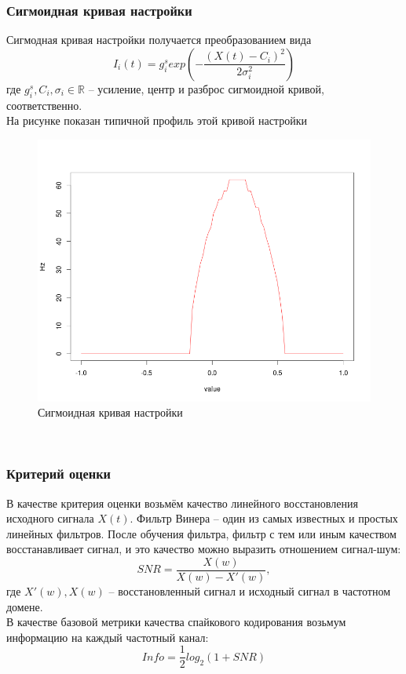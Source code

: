 \documentclass[a4paper,10pt,usenames]{article}
\begin{document}
\subsubsection{Сигмоидная кривая настройки}
\indent Сигмодная кривая настройки получается преобразованием вида
\begin{equation}
I_{i}(t) = g^{s}_{i}exp\left(-\frac{(X(t)-C_{i})^2}{2\sigma_{i}^2} \right)
\end{equation}
где $g^{s}_{i}, C_{i}, \sigma_{i} \in \mathbb{R}$ -- усиление, центр и разброс сигмоидной кривой, соответственно.\\
На рисунке показан типичной профиль этой кривой настройки
\begin{figure}[ht]
\centering
\captionsetup{justification=centering,margin=1cm}
\includegraphics[width=120mm,scale=1]{sigma_curve.png}
\caption{Сигмоидная кривая настройки}
\label{sigma_curve}
\end{figure}\\
\subsubsection{Критерий оценки}
\indent В качестве критерия оценки возьмём качество линейного восстановления исходного сигнала $X(t)$. Фильтр Винера -- один из самых известных и простых линейных фильтров. После обучения фильтра, фильтр с тем или иным качеством восстанавливает сигнал, и это качество можно выразить отношением сигнал-шум:
\begin{equation}
SNR=\frac{X(w)}{X(w)-X'(w)},
\end{equation}
где $X'(w),X(w)$ -- восстановленный сигнал и исходный сигнал в частотном домене.\\
\indent В качестве базовой метрики качества спайкового кодирования возьмум информацию на каждый частотный канал:
\begin{equation}\label{eval}
Info = \frac{1}{2}log_{2}(1+SNR)
\end{equation}
\end{document}

